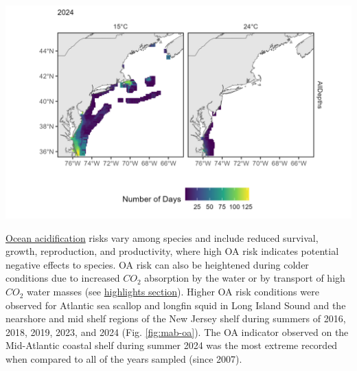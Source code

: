 \documentclass[
  10pt,
]{article}
\let\origfigure\figure
\let\endorigfigure\endfigure
\renewenvironment{figure}[1][2] {
    \expandafter\origfigure\expandafter[H]
} {
    \endorigfigure
}
\begin{document}
\begin{figure}

{\centering \includegraphics[width=6.5in]{images/MidAtlantic/therm_hab_persist_MidAtlantic_2025-09-05} 

}

\caption{The number of days in 2024 where bottom temperature exceeds 15℃ (left) and 24℃ (right) based on the GLORYS 1/12 degree grid.}\label{fig:therm-hab-persist-2024}
\end{figure}

\href{https://noaa-edab.github.io/catalog/ocean_acidification.html}{Ocean acidification} risks vary among species and include reduced survival, growth, reproduction, and productivity, where high OA risk indicates potential negative effects to species. OA risk can also be heightened during colder conditions due to increased \(CO_2\) absorption by the water or by transport of high \(CO_2\) water masses (see \hyperref[highlights]{highlights section}). Higher OA risk conditions were observed for Atlantic sea scallop and longfin squid in Long Island Sound and the nearshore and mid shelf regions of the New Jersey shelf during summers of 2016, 2018, 2019, 2023, and 2024 (Fig. \ref{fig:mab-oa}). The OA indicator observed on the Mid-Atlantic coastal shelf during summer 2024 was the most extreme recorded when compared to all of the years sampled (since 2007).
\end{document}
